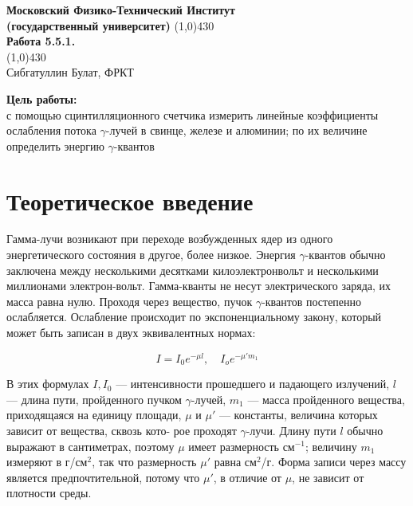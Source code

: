 \documentclass[a4paper, 12pt]{article}%
\begin{document}
\begin{titlepage}

\begin{center}
\large\textbf{Московский Физико-Технический Институт}\\
\large\textbf{(государственный университет)}
\vfill
\line(1,0){430}\\[1mm]
\huge\textbf{Работа 5.5.1.}\\
\line(1,0){430}\\[1mm]
\vfill
\large Сибгатуллин Булат, ФРКТ\\
\end{center}

\end{titlepage}
\noindent \textbf{Цель работы:} \\
\indent с помощью сцинтилляционного счетчика измерить линейные коэффициенты ослабления потока $ \gamma $-лучей в свинце, железе и алюминии; по их величине определить энергию $ \gamma $-квантов\\

\section{Теоретическое введение}

Гамма-лучи возникают при переходе возбужденных ядер из одного энергетического состояния в другое, более низкое. Энергия $ \gamma $-квантов обычно заключена между несколькими десятками килоэлектронвольт и несколькими миллионами электрон-вольт. Гамма-кванты не несут электрического заряда, их масса равна нулю. Проходя через вещество, пучок $ \gamma $-квантов постепенно ослабляется. Ослабление происходит по экспоненциальному закону, который может быть записан в двух эквивалентных нормах:
	
	\begin{equation}\label{I(mu)}
	I = I_0 e^{-\mu l}, \quad I_o e^{-\mu 'm_1} 
	\end{equation}
	
	В этих формулах $ I, I_0 $ --- интенсивности прошедшего и падающего излучений, $ l $ --- длина пути, пройденного пучком $\gamma$-лучей, $ m_1 $ ---
	масса пройденного вещества, приходящаяся на единицу площади, $ \mu $ и
	$ \mu' $ --- константы, величина которых зависит от вещества, сквозь кото-
	рое проходят $\gamma$-лучи. Длину пути $ l $ обычно выражают в сантиметрах,
	поэтому $ \mu $ имеет размерность см$ ^{-1} $; величину $ m_1 $ измеряют в г/см$ ^2 $,
	так что размерность $ \mu' $ равна см$ ^2 $/г. Форма записи через массу является предпочтительной, потому что $ \mu' $, в отличие от $ \mu $, не зависит от плотности среды. 
	
\end{document}
